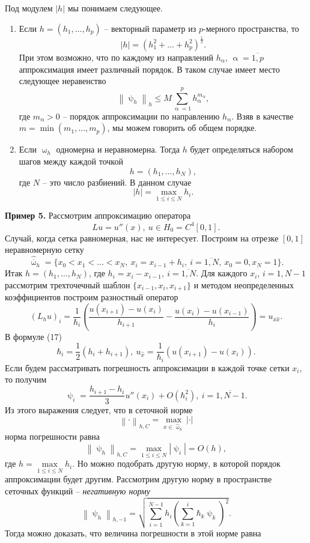 \documentclass[a4paper, 12pt]{report}
\numberwithin{equation}{section}
\newcommand{\ol}{\overline}
\renewcommand{\leq}{\leqslant}
\renewcommand{\alpha}{\upalpha}
\renewcommand{\psi}{\uppsi}
\renewcommand{\omega}{\upomega}
\newcommand\Norm[1]{\left\| #1 \right\|}
\begin{document}
Под модулем $|h|$ мы понимаем следующее.
\begin{enumerate}
	\item Если $h = (h_1,\ldots, h_p)$ -- векторный параметр из $p$-мерного пространства, то $$|h| = \left(h_1^2 + \ldots + h_p^2\right)^\frac12.$$
	При этом возможно, что по каждому из направлений $h_\alpha$, $\alpha = \overline{1,p}$ аппроксимация имеет различный порядок. В таком случае имеет место следующее неравенство
	$$\Norm{\psi_h}_h \leq M \sum_{\alpha=1}^{p}h_\alpha^{m_\alpha},$$
	где $m_\alpha>0$ -- порядок аппроксимации по направлению $h_\alpha$. Взяв в качестве $m = \min (m_1,\ldots, m_p)$, мы можем говорить об общем порядке.
	\item Если $\omega_h$ одномерна и неравномерна. Тогда $h$ будет определяться набором шагов между каждой точкой $$h = (h_1,\ldots, h_N),$$ где $N$ -- это число разбиений. В данном случае $$|h| = \underset{1\leq i \leq N}{\max}h_i.$$
\end{enumerate}
\textbf{Пример 5.} Рассмотрим аппроксимацию оператора $$Lu = u''(x),\ u\in H_0 = C^4[0,1].$$
Случай, когда сетка равномерная, нас не интересует. Построим на отрезке $[0,1]$ неравномерную сетку $$\hat{\ol \omega}_h = \{x_0 < x_1 < \ldots < x_N,\ x_i = x_{i-1}+h_{i},\ i=\ol{1,N},\ x_0=0, x_N=1\}.$$
Итак $h = (h_1,\ldots, h_N)$, где $h_i = x_i - x_{i-1},\ i=\ol{1,N}.$ Для каждого $x_i$, $i=\ol {1, N-1}$ рассмотрим трехточечный шаблон $\{x_{i-1}, x_i, x_{i+1}\}$ и методом неопределенных коэффициентов построим разностный оператор \begin{equation}
	(L_hu)_i = \dfrac{1}{ \hbar_i}\left(\dfrac{u(x_{i+1}) - u(x_i)}{h_{i+1}} - \dfrac{u(x_i) - u(x_{i-1})}{h_i}\right)=u_{\ol x \hat x}.
\end{equation}
В формуле (17) $$\hbar_i = \dfrac12 (h_i + h_{i+1}),\ u_{\hat x}=\dfrac{1}{\hbar_i}(u(x_{i+1}) - u(x_i)).$$
Если будем рассматривать погрешность аппроксимации в каждой точке сетки $x_i$, то получим
$$\psi_i = \dfrac{h_{i+1} - h_i}{3}u''(x_i) + O(\hbar_i^2),\ i = \ol{1, N-1}.$$
Из этого выражения следует, что в сеточной норме $$\Norm{\cdot}_{h, C} = \underset{x \in \hat \omega_h}{\max}|\cdot |$$
норма погрешности равна
$$\Norm{\psi_h}_{h,C} = \underset{1\leq i \leq N}{\max}|\psi_i|=O(h),$$
где $h = \underset{1\leq i \leq N}{\max}h_i.$
Но можно подобрать другую норму, в которой порядок аппроксимации будет другим. Рассмотрим другую норму в пространстве сеточных функций -- \textit{негативную норму}
$$\Norm{\psi_h}_{h, -1}=\sqrt{\sum_{i=1}^{N-1}h_i\left(\sum_{k=1}^i \hbar_k \psi_k\right)^2}.$$
Тогда можно доказать, что величина погрешности в этой норме равна
\end{document}
